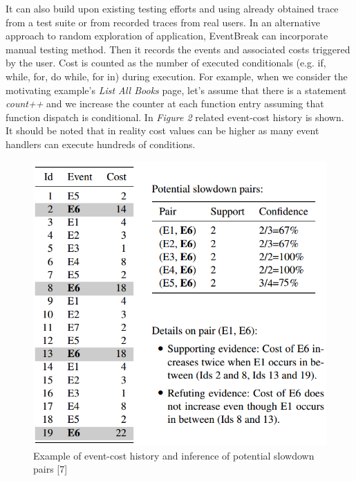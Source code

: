 \documentclass[authoryear,preprint, twocolumn]{sigplanconf}
\begin{document}
\newline It can also build upon existing testing efforts and using already obtained trace from a test suite or from recorded traces from  real users. In an alternative approach to random exploration of application, EventBreak can incorporate manual testing method. Then it records the events and associated costs triggered by the user. Cost is counted as the number of executed conditionals (e.g. \textmd{if, while, for, do while, for in}) during execution. For example, when we consider the motivating example's \emph{List All Books} page, let's assume that there is a statement \emph{count++} and we increase the counter at each function entry assuming that function dispatch is conditional. In \emph{Figure 2} related event-cost history is shown. It should be noted that in reality cost values can be higher as many event handlers can execute hundreds of conditions.

\begin{figure}[ht]
	\centering
	\includegraphics[width=1.0\linewidth]{figures/eventbreak1}
	\caption[Example of event-cost history and inference of potential slowdown pairs]{\label{f:approxappmodel}Example of event-cost history and inference of potential slowdown pairs [7]}
\end{figure}
\end{document}
